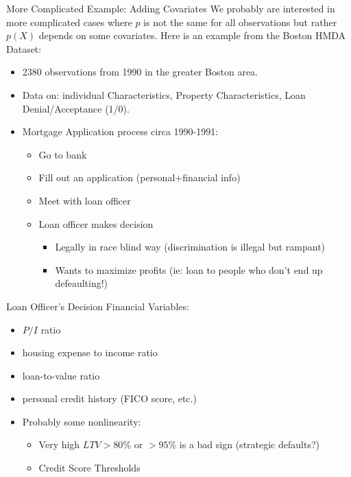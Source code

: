 \documentclass[aspectratio=169]{beamer}
\begin{document}
\begin{frame}{More Complicated Example: Adding Covariates}
We probably are interested in more complicated cases where $p$ is not the same for all observations but rather $p(X)$ depends on some covariates. Here is an example from the Boston HMDA Dataset:
\begin{itemize}
\item 2380 observations from 1990 in the greater Boston area.
\item Data on: individual Characteristics, Property Characteristics, Loan Denial/Acceptance (1/0).
\item Mortgage Application process circa 1990-1991:
\begin{itemize}
\item Go to bank
\item Fill out an application (personal+financial info)
\item Meet with loan officer
\item Loan officer makes decision
\begin{itemize}
\item Legally in race blind way (discrimination is illegal but rampant)
\item Wants to maximize profits (ie: loan to people who don't end up defeaulting!)
\end{itemize}
\end{itemize}
\end{itemize}
\end{frame}


\begin{frame}{Loan Officer's Decision}
Financial Variables:
\begin{itemize}
\item $P/I$ ratio
\item housing expense to income ratio
\item loan-to-value ratio
\item personal credit history (FICO score, etc.)
\item Probably some nonlinearity:
\begin{itemize}
\item Very high $LTV > 80\%$ or $>95\%$ is a bad sign (strategic defaults?)
\item Credit Score Thresholds
\end{itemize}
\end{itemize}
\end{frame}
\end{document}
